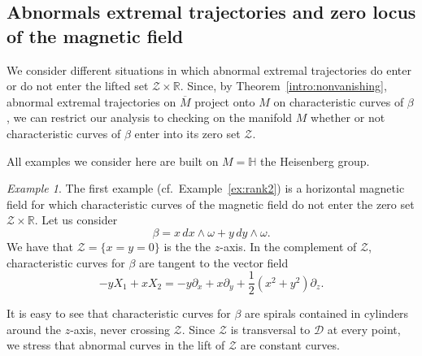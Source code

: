 \documentclass{amsart}
\theoremstyle{plain}
\theoremstyle{definition}
\theoremstyle{remark}
\newtheorem{example}[thm]{Example}
\newcommand{\R}{\mathbb{R}}
\newcommand{\p}{\partial}												%
\newcommand{\distr}{\mathcal{D}}								%
\newcommand{\B}{\beta}
\newcommand{\lift}[1]{\overline{#1}} 							%
\begin{document}
\subsection{Abnormals extremal trajectories and zero locus of the magnetic field}

We consider different situations in which abnormal extremal trajectories do enter or do not enter the lifted set $\mathcal{Z}\times \R$.
Since, by Theorem~\ref{intro:nonvanishing}, abnormal extremal trajectories on $\lift M$ project onto $M$ on characteristic curves of $\beta$, we can restrict our analysis to checking on the manifold $M$ whether or not characteristic curves of $\beta$ enter into its zero set $\mathcal{Z}$.

All examples we consider here are built on $M=\mathbb{H}$ the Heisenberg group.
\begin{example}
The first example (cf.\ Example~\ref{ex:rank2}) is a horizontal magnetic field for which characteristic curves of the magnetic field do not enter the zero set $\mathcal{Z}\times \R$. 
Let us consider 
\begin{equation}
\B=x\,dx\wedge\omega+y\,dy\wedge\omega.
\end{equation}
We have that $\mathcal{Z}=\{x=y=0\}$ is the the $z$-axis. 
In the complement of $\mathcal{Z}$, characteristic curves for $\beta$ are tangent to the vector field
\begin{equation}
-yX_1+xX_2=-y\p_x+x\p_y+\frac{1}{2}(x^{2}+y^{2})\p_z.
\end{equation}


It is easy to see that characteristic curves for $\B$ are spirals contained in cylinders around the $z$-axis, never crossing $\mathcal{Z}$.
Since $\mathcal{Z}$ is transversal to $\distr$ at every point, we stress that abnormal curves in the lift of $\mathcal{Z}$ are constant curves.
\end{example}
\end{document}
